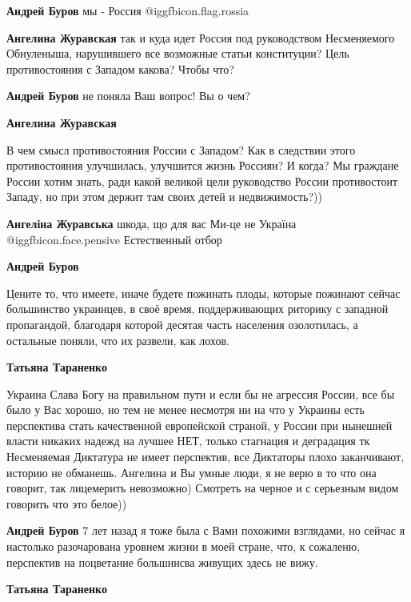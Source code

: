 \begin{itemize}
\begin{itemize}
\textbf{Андрей Буров} мы - Россия @igg{fbicon.flag.rossia}

\textbf{Ангелина Журавская} так и куда идет Россия под руководством Несменяемого Обнуленыша, нарушившего все возможные статьи конституции? Цель противостояния с Западом какова? Чтобы что?

\textbf{Андрей Буров} не поняла Ваш вопрос! Вы о чем?

\textbf{Ангелина Журавская} 

В чем смысл противостояния России с Западом? Как в следствии этого
противостояния улучшилась, улучшится жизнь Россиян? И когда? Мы граждане России
хотим знать, ради какой великой цели руководство России противостоит Западу, но
при этом держит там своих детей и недвижимость?))

\textbf{Ангеліна Журавська} шкода, що для вас Ми-це не Україна @igg{fbicon.face.pensive} 
Естественный отбор


\textbf{Андрей Буров} 

Цените то, что имеете, иначе будете пожинать плоды, которые пожинают сейчас
большинство украинцев, в своё время, поддерживающих риторику с западной
пропагандой, благодаря которой десятая часть населения озолотилась, а остальные
поняли, что их развели, как лохов.

\textbf{Татьяна Тараненко} 

Украина Слава Богу на правильном пути и если бы не агрессия России, все бы было
у Вас хорошо, но тем не менее несмотря ни на что у Украины есть перспектива
стать качественной европейской страной, у России при нынешней власти никаких
надежд на лучшее НЕТ, только стагнация и деградация тк Несменяемая Диктатура не
имеет перспектив, все Диктаторы плохо заканчивают, историю не обманешь.
Ангелина и Вы умные люди, я не верю в то что она говорит, так лицемерить
невозможно) Смотреть на черное и с серьезным видом говорить что это белое))

\textbf{Андрей Буров} 7 лет назад я тоже была с Вами похожими взглядами, но сейчас я настолько разочарована уровнем жизни в моей стране, что, к сожаленю, перспектив на поцветание большинсва живущих здесь не вижу.

\textbf{Татьяна Тараненко} 


\end{itemize}
\end{itemize}
